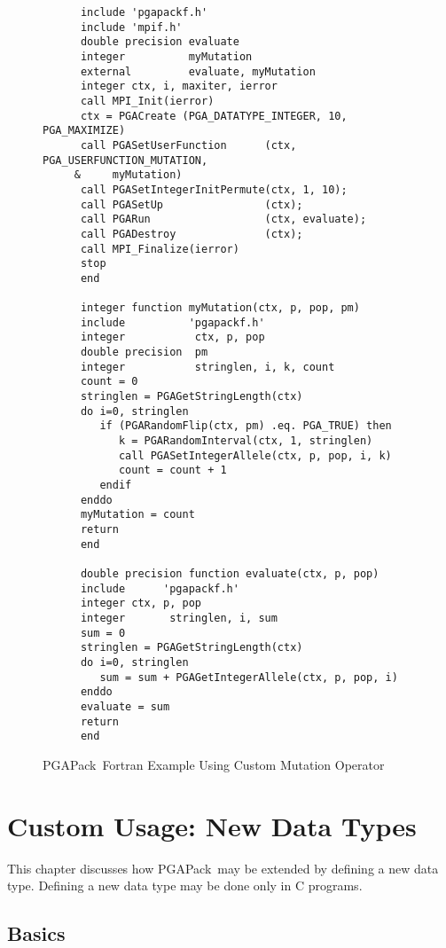 \documentclass{report}
\newcommand{\pga}{PGAPack}
\begin{document}
\begin{figure}
\begin{verbatim}
      include 'pgapackf.h'
      include 'mpif.h'
      double precision evaluate
      integer          myMutation
      external         evaluate, myMutation
      integer ctx, i, maxiter, ierror
      call MPI_Init(ierror)
      ctx = PGACreate (PGA_DATATYPE_INTEGER, 10, PGA_MAXIMIZE)
      call PGASetUserFunction      (ctx, PGA_USERFUNCTION_MUTATION,
     &     myMutation)
      call PGASetIntegerInitPermute(ctx, 1, 10);
      call PGASetUp                (ctx);
      call PGARun                  (ctx, evaluate);
      call PGADestroy              (ctx);
      call MPI_Finalize(ierror)
      stop
      end
      
      integer function myMutation(ctx, p, pop, pm)
      include          'pgapackf.h'
      integer           ctx, p, pop
      double precision  pm
      integer           stringlen, i, k, count
      count = 0
      stringlen = PGAGetStringLength(ctx)
      do i=0, stringlen
         if (PGARandomFlip(ctx, pm) .eq. PGA_TRUE) then
            k = PGARandomInterval(ctx, 1, stringlen)
            call PGASetIntegerAllele(ctx, p, pop, i, k)
            count = count + 1
         endif
      enddo
      myMutation = count
      return
      end

      double precision function evaluate(ctx, p, pop)
      include      'pgapackf.h'
      integer ctx, p, pop
      integer       stringlen, i, sum
      sum = 0
      stringlen = PGAGetStringLength(ctx)
      do i=0, stringlen
         sum = sum + PGAGetIntegerAllele(ctx, p, pop, i)
      enddo
      evaluate = sum
      return
      end
\end{verbatim}
\caption{\pga\ Fortran Example Using Custom Mutation Operator}
\label{example:maxbit-custom-f77}
\end{figure}

\chapter{Custom Usage: New Data Types}\label{chp:new-data}

This chapter discusses how \pga\ may be extended by defining a new data type.
Defining a new data type may be done  only in C programs.

\section{Basics}
\end{document}
